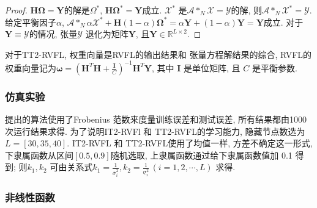 \begin{proof}
  $\bm H \bm \Omega=\bm Y$的解是$\Omega^*$, $\bm H \bm \Omega^*=\bm Y$成立.
  $\mathcal X^*$ 是$\mathcal A *_N \mathcal X=\mathcal Y$的解, 则$\mathcal A *_N \mathcal X^*=\mathcal Y$.
  给定平衡因子$\alpha$, $\mathcal A *_N  \alpha \mathcal X^*+\bm H (1-\alpha)\bm \Omega^*=\alpha \bm Y+(1-\alpha)\bm Y=\bm Y$成立.
  对于$\bm Y\equiv \mathcal Y$的情况, 张量$\mathcal Y$ 退化为矩阵$\bm Y$, 且$\bm Y\in \mathbb R^{L\times 2}$.
\end{proof}
\begin{remark}
  对于TT2-RVFL, 权重向量是RVFL的输出结果和 张量方程解结果的综合, RVFL的权重向量记为$\bm \omega=(\bm H^T \bm H+\frac {\bm I}  C)^{-1} \bm H^T \bm Y$, 其中 $\bm I$ 是单位矩阵, 且 $C$ 是平衡参数.
\end{remark}

\subsubsection{仿真实验} \label{TensorFLNsection4}
提出的算法使用了Frobenius 范数来度量训练误差和测试误差,  所有结果都由1000次运行结果求得. 为了说明IT2-RVFl 和 TT2-RVFL的学习能力, 隐藏节点数选为$L=[30,35,40]$.
IT2-RVFL 和 TT2-RVFL使用了均值一样, 方差不确定这一形式, 下隶属函数从区间$[0.5,0.9]$随机选取, 上隶属函数通过给下隶属函数值加 0.1 得到; 则$k_1, k_2$ 可由关系式$k_1=\frac{1} {\bar{\sigma} ^2_{i}}, k_2=\frac{1} {\underline{\sigma} ^2_{i}} \,(i=1,2,\cdots, L)$ 求得.
\subsubsection{非线性函数}

